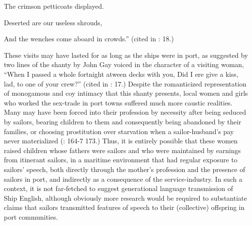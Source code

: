 The crimson petticoats displayed. 

Deserted are our useless shrouds, 

And the wenches come aboard in crowds.” (cited in \citealt{Hugill1969}: 18.)

These visits may have lasted for as long as the ships were in port, as suggested by two lines of the shanty by John Gay voiced in the character of a visiting woman, “When I passed a whole fortnight atween decks with you, Did I ere give a kiss, lad, to one of your crew?” (cited in \citealt{Hugill1969}: 17.) Despite the romanticized representation of monogamous and coy intimacy that this shanty presents, local women and girls who worked the sex-trade in port towns suffered much more caustic realities. Many may have been forced into their profession by necessity after being seduced by sailors, bearing children to them and consequently being abandoned by their families, or choosing prostitution over starvation when a sailor-husband’s pay never materialized (\citealt{AdkinsAdkins2008}: 164-7 173.) Thus, it is entirely possible that these women raised children whose fathers were sailors and who were maintained by earnings from itinerant sailors, in a maritime environment that had regular exposure to sailors’ speech, both directly through the mother’s profession and the presence of sailors in port, and indirectly as a consequence of the service-industry. In such a context, it is not far-fetched to suggest generational language transmission of Ship English, although obviously more research would be required to substantiate claims that sailors transmitted features of speech to their (collective) offspring in port communities. 

